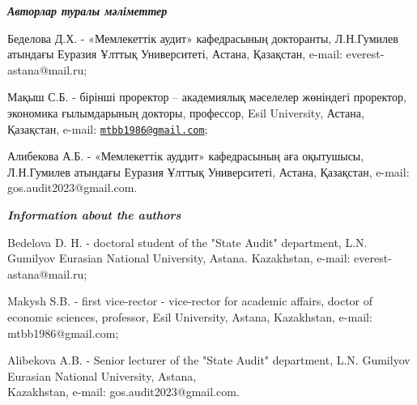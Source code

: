 \begin{authorinfo}
\emph{{\bfseries Авторлар туралы мәліметтер}}

Беделова Д.Х. - «Мемлекеттік аудит» кафедрасының докторанты, Л.Н.Гумилев
атындағы Еуразия Ұлттық Университеті, Астана, Қазақстан, e-mail:
everest-astana@mail.ru;

Мақыш С.Б. - бірінші проректор -- академиялық мәселелер жөніндегі
проректор, экономика ғылымдарының докторы, профессор, Esil University,
Астана, Қазақстан, e-mail:
\href{mailto:mtbb1986@gmail.com}{\nolinkurl{mtbb1986@gmail.com}};

Алибекова А.Б. - «Мемлекеттік ауддит» кафедрасының аға оқытушысы,
Л.Н.Гумилев атындағы Еуразия Ұлттық Университеті, Астана, Қазақстан,
e-mail: gos.audit2023@gmail.com.

\emph{{\bfseries Information about the authors}}

Bedelova D. H. - doctoral student of the "State Audit" department, L.N.
Gumilyov Eurasian National University, Astana. Kazakhstan, e-mail:
everest-astana@mail.ru;

Makysh S.B. - first vice-rector - vice-rector for academic affairs,
doctor of economic sciences, professor, Esil University, Astana,
Kazakhstan, e-mail: mtbb1986@gmail.com;

Alibekova A.B. - Senior lecturer of the "State Audit" department, L.N.
Gumilyov Eurasian National University, Astana, \\Kazakhstan, e-mail:
gos.audit2023@gmail.com.
\end{authorinfo}

